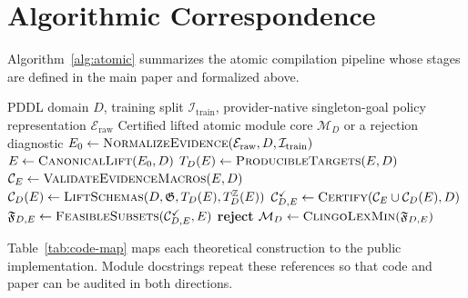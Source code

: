 \section{Algorithmic Correspondence}
\label{app:code-map}

Algorithm~\ref{alg:atomic} summarizes the atomic compilation pipeline whose
stages are defined in the main paper and formalized above.

\begin{algorithm}[htbp]
\caption{Compile the Certified Lifted Atomic Module Core}
\label{alg:atomic}
\begin{algorithmic}[1]
\REQUIRE PDDL domain $D$, training split $\mathcal I_{\mathrm{train}}$,
provider-native singleton-goal policy representation $\mathcal E_{\mathrm{raw}}$
\ENSURE Certified lifted atomic module core $\mathcal M_D$ or a rejection diagnostic
\STATE $E_0\leftarrow\textsc{NormalizeEvidence}(\mathcal E_{\mathrm{raw}},D,\mathcal I_{\mathrm{train}})$
\STATE $E\leftarrow\textsc{CanonicalLift}(E_0,D)$
\STATE $T_D(E)\leftarrow\textsc{ProducibleTargets}(E,D)$
\STATE $\mathcal C_E\leftarrow\textsc{ValidateEvidenceMacros}(E,D)$
\STATE $\mathcal C_D(E)\leftarrow
\textsc{LiftSchemas}(D,\mathfrak G,T_D(E),T_D^{\mathbb Z}(E))$
\STATE $\mathcal C^{\checkmark}_{D,E}\leftarrow
\textsc{Certify}(\mathcal C_E\cup\mathcal C_D(E),D)$
\STATE $\mathfrak F_{D,E}\leftarrow
\textsc{FeasibleSubsets}(\mathcal C^{\checkmark}_{D,E},E)$
  \STATE \textbf{reject}
\ENDIF
\RETURN $\mathcal M_D\leftarrow
\textsc{ClingoLexMin}(\mathfrak F_{D,E})$
\end{algorithmic}
\end{algorithm}

Table~\ref{tab:code-map} maps each theoretical construction to the public
implementation. Module docstrings repeat these references so that code and
paper can be audited in both directions.

